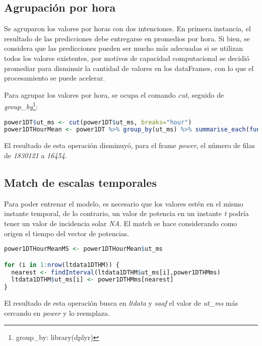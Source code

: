 \documentclass[../Main.tex]{subfiles}
\begin{document}
\subsection{Agrupación por hora}

Se agruparon los valores por horas con dos intenciones. En primera instancia, el resultado de las predicciones debe entregarse en promedios por hora. Si bien, se considera que las predicciones pueden ser mucho más adecuadas si se utilizan todos los valores existentes, por motivos de capacidad computacional se decidió promediar para disminuir la cantidad de valores en los dataFrames, con lo que el procesamiento se puede acelerar.
\newline \par
Para agrupar los valores por hora, se ocupa el comando \textit{cut}, seguido de \textit{group\_by}\footnote{group\_by: library(dplyr)}:
\newline \par
\begin{lstlisting}[language=R]
power1DT$ut_ms <- cut(power1DT$ut_ms, breaks="hour")
power1DTHourMean <- power1DT %>% group_by(ut_ms) %>% summarise_each(funs(mean))
\end{lstlisting}

El resultado de esta operación disminuyó, para el frame \textit{power}, el número de filas de \textit{1830121} a \textit{16454}.

\subsection{Match de escalas temporales}

Para poder entrenar el modelo, es necesario que los valores estén en el mismo instante temporal, de lo contrario, un valor de potencia en un instante \textit{t} podría tener un valor de incidencia solar \textit{NA}. El match se hace considerando como origen el tiempo del vector de potencias.
\newline \par
\begin{lstlisting}[language=R]
power1DTHourMeanMS <- power1DTHourMean$ut_ms

for (i in 1:nrow(ltdata1DTHM)) {
  nearest <- findInterval(ltdata1DTHM$ut_ms[i],power1DTHMms)
  ltdata1DTHM$ut_ms[i] <- power1DTHMms[nearest]
}
\end{lstlisting}

El resultado de esta operación busca en \textit{ltdata} y \textit{saaf} el valor de \textit{ut\_ms} más cercando en \textit{power} y lo reemplaza.
\end{document}

